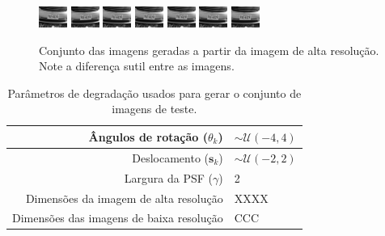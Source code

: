 \begin{figure}[H]
	\includegraphics{figures/degradedImg/result-13.png}
	\includegraphics{figures/degradedImg/result-14.png}
	\includegraphics{figures/degradedImg/result-15.png}
	\includegraphics{figures/degradedImg/result-16.png}
	\includegraphics{figures/degradedImg/result-17.png}
	\includegraphics{figures/degradedImg/result-18.png}
	\includegraphics{figures/degradedImg/result-19.png}
	\caption{Conjunto das imagens geradas a partir da imagem de alta resolução. Note a diferença sutil entre as imagens.}
	\label{fig:frames}
\end{figure}

\begin{table}[h]
	\centering
	\caption{Parâmetros de degradação usados para gerar o conjunto de imagens de teste.}
	\begin{tabular}{r | l}
		Ângulos de rotação ($\theta_k$) & $ \sim \mathcal{U}(-4, 4)$ \\ \hline
		Deslocamento ($\mathbf{s}_k$)& $\sim \mathcal{U}(-2,2)$\\ \hline
		Largura da PSF ($\gamma$) & 2 \\ \hline
		Dimensões da imagem de alta resolução & XXXX \\ \hline
		Dimensões das imagens de baixa resolução & CCC \\

	\end{tabular}

\end{table}
